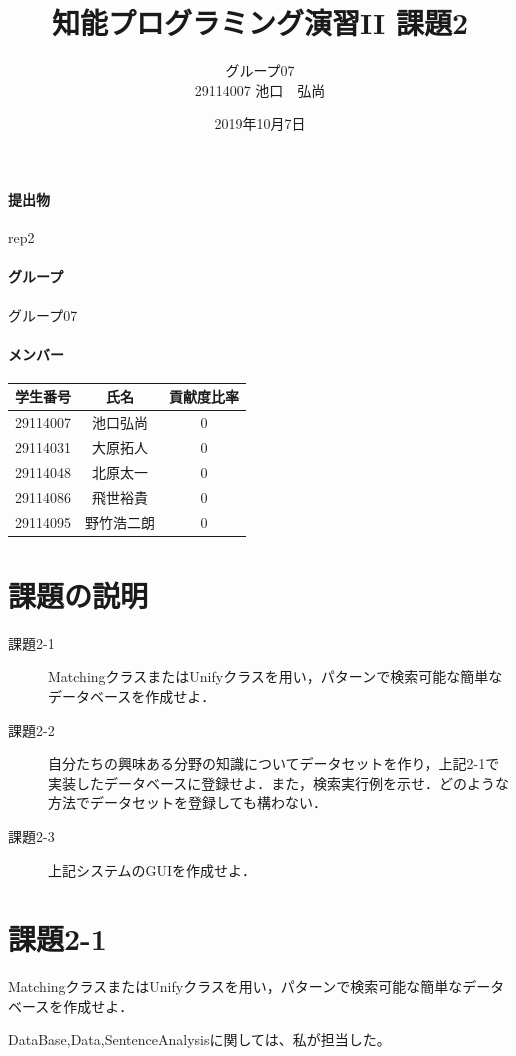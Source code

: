 \documentclass{jarticle}
\title{知能プログラミング演習II 課題2}
\author{グループ07\\
  29114007 池口　弘尚\\
}
\date{2019年10月7日}
\begin{document}
\maketitle

\paragraph{提出物} rep2
\paragraph{グループ} グループ07
\paragraph{メンバー}
\begin{tabular}{|c|c|c|}
  \hline
  学生番号&氏名&貢献度比率\\
  \hline\hline
  29114007&池口弘尚&0\\
  \hline
  29114031&大原拓人&0\\
  \hline
  29114048&北原太一&0\\
  \hline
  29114086&飛世裕貴&0\\
  \hline
  29114095&野竹浩二朗&0\\
\end{tabular}

\section{課題の説明}
\begin{description}
\item[課題2-1] MatchingクラスまたはUnifyクラスを用い，パターンで検索可能な簡単なデータベースを作成せよ．
\item[課題2-2] 自分たちの興味ある分野の知識についてデータセットを作り，上記2-1で実装したデータベースに登録せよ．また，検索実行例を示せ．どのような方法でデータセットを登録しても構わない．
\item[課題2-3] 上記システムのGUIを作成せよ．
\end{description}


\section{課題2-1}
\begin{screen}
  MatchingクラスまたはUnifyクラスを用い，パターンで検索可能な簡単なデータベースを作成せよ．
\end{screen}

DataBase,Data,SentenceAnalysisに関しては、私が担当した。
\end{document}
